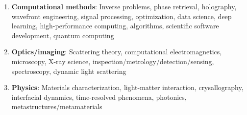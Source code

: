 \begin{enumerate}
    \item \textbf{Computational methods}: Inverse problems, phase retrieval, holography, wavefront engineering, signal processing, optimization, data science, deep learning, high-performance computing, algorithms, scientific software development, quantum computing
    \item \textbf{Optics/imaging}: Scattering theory, computational electromagnetics, microscopy, X-ray science, inspection/metrology/detection/sensing, spectroscopy, dynamic light scattering 
    \item \textbf{Physics}: Materials characterization, light-matter interaction, crysallography, interfacial dynamics, time-resolved phenomena, photonics, metastructures/metamaterials
\end{enumerate}